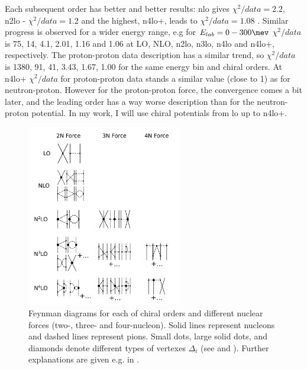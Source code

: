 Each subsequent order has better and better results: \gls{nlo} gives $\chi^2/data = 2.2$, \gls{n2lo} - $\chi^2/data = 1.2$
and the highest, \gls{n4lo+}, leads to $\chi^2/data = 1.08$ \cite{reinkrebs2018}.
Similar progress is observed for a wider energy range, e.g for $E_{lab} = 0-300 \unit{\mev}$
$\chi^2/data$ is 75, 14, 4.1, 2.01, 1.16 and 1.06
at LO, NLO, \gls{n2lo}, \gls{n3lo}, \gls{n4lo} and \gls{n4lo+}, respectively.
The proton-proton data description has a similar trend, so $\chi^2/data$ is 1380, 91, 41, 3.43, 1.67, 1.00 
for the same energy bin and chiral orders. At \gls{n4lo+} $\chi^2/data$ for proton-proton data
stands a similar value (close to 1) as for neutron-proton.
However for the proton-proton force, the convergence comes a bit later, and 
the leading order has a way worse description than for the neutron-proton potential.
In my work, I will use chiral potentials from \gls{lo} up to \gls{n4lo+}.

\begin{figure}[h]
    \begin{center}
    \includegraphics[width=0.6\textwidth]{Diagrams/Diagrams.pdf}
    \end{center}
    \caption{ Feynman diagrams for each of chiral orders and different nuclear forces (two-, three- and four-nucleon).
    Solid lines represent nucleons and dashed lines represent pions. Small dots, large solid dots,
    and diamonds denote different types of vertexes $\Delta_i$ (see  and ).
    Further explanations are given e.g. in \cite{Entem2017}.}
    \label{chiral_diagrams}
\end{figure}


